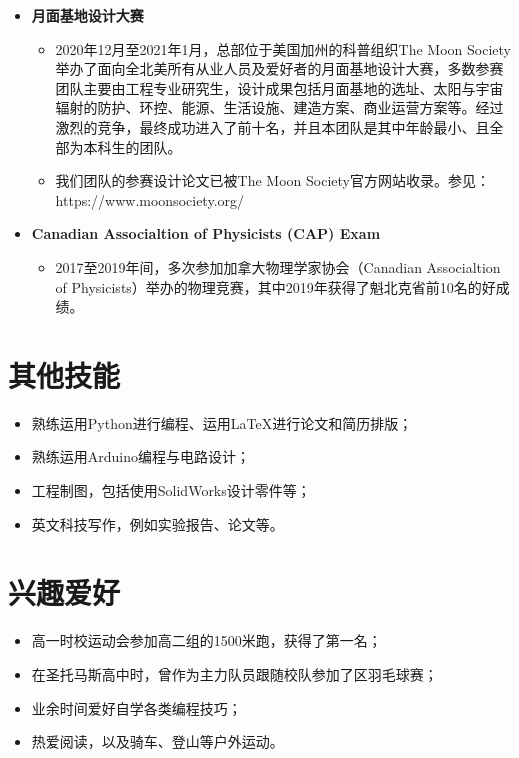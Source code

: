 \documentclass{article}
\begin{document}
\begin{itemize}
\begin{itemize}
  \end{itemize}

  \item \textbf{月面基地设计大赛}
  \begin{itemize}
    \item 2020年12月至2021年1月，总部位于美国加州的科普组织The Moon Society举办了面向全北美所有从业人员及爱好者的月面基地设计大赛，多数参赛团队主要由工程专业研究生，设计成果包括月面基地的选址、太阳与宇宙辐射的防护、环控、能源、生活设施、建造方案、商业运营方案等。经过激烈的竞争，最终成功进入了前十名，并且本团队是其中年龄最小、且全部为本科生的团队。
    \item 我们团队的参赛设计论文已被The Moon Society官方网站收录。参见：https://www.moonsociety.org/
  \end{itemize}

  \item \textbf{Canadian Associaltion of Physicists (CAP) Exam}
  \begin{itemize}
    \item 2017至2019年间，多次参加加拿大物理学家协会（Canadian Associaltion of Physicists）举办的物理竞赛，其中2019年获得了魁北克省前10名的好成绩。
  \end{itemize}

\end{itemize}

\section{其他技能}
\indent

\begin{itemize}
  \item 熟练运用Python进行编程、运用LaTeX进行论文和简历排版；
  \item 熟练运用Arduino编程与电路设计；
  \item 工程制图，包括使用SolidWorks设计零件等；
  \item 英文科技写作，例如实验报告、论文等。
\end{itemize}

\section{兴趣爱好}
\indent
\begin{itemize}
  \item 高一时校运动会参加高二组的1500米跑，获得了第一名；
  \item 在圣托马斯高中时，曾作为主力队员跟随校队参加了区羽毛球赛；
  \item 业余时间爱好自学各类编程技巧；
  \item 热爱阅读，以及骑车、登山等户外运动。
\end{itemize}
\end{document}
